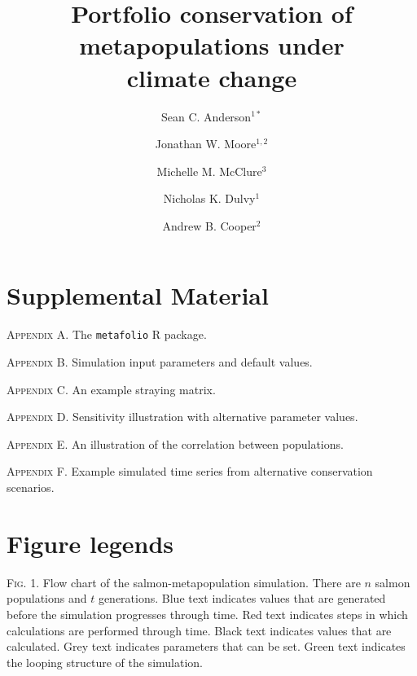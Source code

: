 \documentclass[12pt]{article}
\title{Portfolio conservation of metapopulations under\\climate change}
\author{
Sean C. Anderson$^{1\ast}$ \and Jonathan W. Moore$^{1,2}$ \and Michelle M. McClure$^3$ \and
Nicholas K. Dulvy$^1$ \and Andrew B. Cooper$^2$
}
\date{}
\begin{document}
\raggedright


\linenumbers

\begin{spacing}{1.9}
\setlength{\parindent}{0.9cm}

\maketitle





%

\clearpage

\section{Supplemental Material}

\noindent
\textsc{Appendix A.} The \texttt{metafolio} \textsf{R} package.

\noindent
\textsc{Appendix B.} Simulation input parameters and default values.

\noindent
\textsc{Appendix C.} An example straying matrix.

\noindent
\textsc{Appendix D.} Sensitivity illustration with alternative parameter values.

\noindent
\textsc{Appendix E.} An illustration of the correlation between populations.

\noindent
\textsc{Appendix F.} Example simulated time series from alternative conservation scenarios.

\clearpage

\section{Figure legends}

\textsc{Fig. 1}. Flow chart of the salmon-metapopulation simulation. There are $n$ salmon populations and $t$ generations. Blue text indicates values that are generated before the simulation progresses through time. Red text indicates steps in which calculations are performed through time. Black text indicates values that are calculated. Grey text indicates parameters that can be set. Green text indicates the looping structure of the simulation.



\end{spacing}
\end{document}
